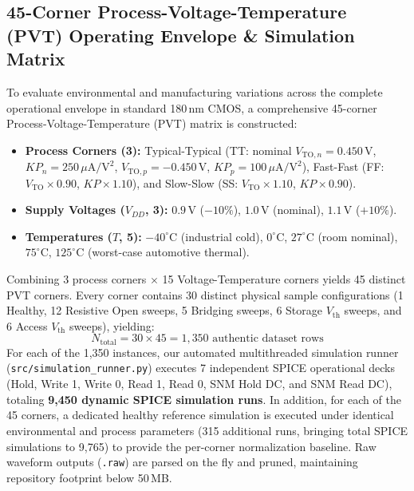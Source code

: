 \documentclass[conference]{IEEEtran}
\begin{document}
\subsection{45-Corner Process-Voltage-Temperature (PVT) Operating Envelope \& Simulation Matrix}
To evaluate environmental and manufacturing variations across the complete operational envelope in standard 180\,nm CMOS, a comprehensive 45-corner Process-Voltage-Temperature (PVT) matrix is constructed:
\begin{itemize}
    \item \textbf{Process Corners (3):} Typical-Typical (TT: nominal $V_{\text{TO},n} = 0.450\,\text{V}$, $KP_n = 250\,\mu\text{A}/\text{V}^2$, $V_{\text{TO},p} = -0.450\,\text{V}$, $KP_p = 100\,\mu\text{A}/\text{V}^2$), Fast-Fast (FF: $V_{\text{TO}} \times 0.90$, $KP \times 1.10$), and Slow-Slow (SS: $V_{\text{TO}} \times 1.10$, $KP \times 0.90$).
    \item \textbf{Supply Voltages ($V_{DD}$, 3):} $0.9\,\text{V}$ ($-10\%$), $1.0\,\text{V}$ (nominal), $1.1\,\text{V}$ ($+10\%$).
    \item \textbf{Temperatures ($T$, 5):} $-40^\circ\text{C}$ (industrial cold), $0^\circ\text{C}$, $27^\circ\text{C}$ (room nominal), $75^\circ\text{C}$, $125^\circ\text{C}$ (worst-case automotive thermal).
\end{itemize}
Combining 3 process corners $\times$ 15 Voltage-Temperature corners yields 45 distinct PVT corners. Every corner contains 30 distinct physical sample configurations (1 Healthy, 12 Resistive Open sweeps, 5 Bridging sweeps, 6 Storage $V_{\text{th}}$ sweeps, and 6 Access $V_{\text{th}}$ sweeps), yielding:
\begin{equation}
N_{\text{total}} = 30 \times 45 = 1{,}350 \text{ authentic dataset rows}
\end{equation}
For each of the 1,350 instances, our automated multithreaded simulation runner (\texttt{src/simulation\_runner.py}) executes 7 independent SPICE operational decks (Hold, Write 1, Write 0, Read 1, Read 0, SNM Hold DC, and SNM Read DC), totaling \textbf{9,450 dynamic SPICE simulation runs}. In addition, for each of the 45 corners, a dedicated healthy reference simulation is executed under identical environmental and process parameters (315 additional runs, bringing total SPICE simulations to 9,765) to provide the per-corner normalization baseline. Raw waveform outputs (\texttt{.raw}) are parsed on the fly and pruned, maintaining repository footprint below 50\,MB.
\end{document}
